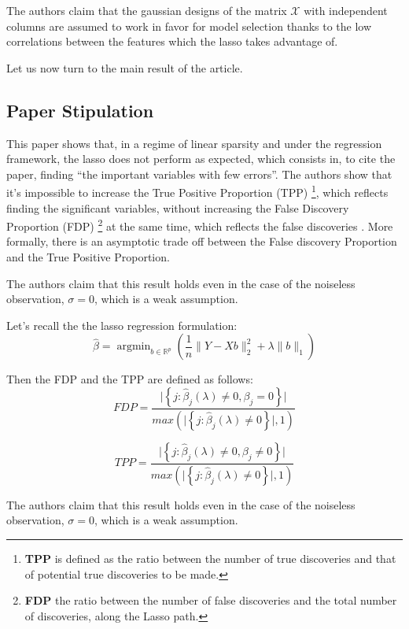 \documentclass[10pt,onecolumn,letterpaper]{article}
\DeclareMathOperator*{\argmin}{argmin}
\begin{document}
The authors claim that the gaussian designs of the matrix $\mathcal{X}$ with independent columns are assumed to work in favor for model selection thanks to the low correlations between the features which the lasso takes advantage of.


Let us now turn to the main result of the article.


\subsection{Paper Stipulation }

This paper shows that, in a regime of linear sparsity and under the regression framework, the lasso does not perform as expected, which consists in, to cite the paper, finding “the important variables with few errors”. The authors show that it’s impossible to increase the True Positive Proportion (TPP)  \footnote{\label{tpp}\textbf{TPP} is defined as the ratio between the number of true discoveries and that of potential true discoveries to be made.},  which reflects finding the significant variables, without increasing the False Discovery Proportion (FDP) \footnote{\label{fdp}
\textbf{FDP} the ratio between the number of false discoveries and the total number of discoveries, along the Lasso path.} at the same time, which reflects the false discoveries . More formally, there is an asymptotic trade off between the False discovery Proportion and the True Positive Proportion.
\newline 

The authors claim that this result holds even in the case of the noiseless observation, $\sigma = 0$, which is a weak assumption.
\newline 

Let's recall the the lasso regression formulation:
$$
\hat{\beta} = \argmin_{b \in \mathbb{R}^p} \left( \frac{1}{n}\lVert Y - Xb \rVert_2^2 + \lambda \lVert b \rVert_1 \right )
$$

Then the FDP and the TPP are defined as follows:
$$
FDP = \frac{\vert \left\{ j: \hat{\beta}_j(\lambda) \neq 0, \beta_j = 0 \right\} \vert}{ max \left( \vert \left\{ j: \hat{\beta}_j(\lambda) \neq 0 \right\} \vert, 1 \right) }
$$

$$
TPP = \frac{\vert \left\{ j: \hat{\beta}_j(\lambda) \neq 0, \beta_j \neq 0 \right\} \vert}{ max \left( \vert \left\{ j: \hat{\beta}_j(\lambda) \neq 0 \right\} \vert, 1 \right) }
$$

The authors claim that this result holds even in the case of the noiseless observation, $\sigma = 0$, which is a weak assumption.
\newline
\end{document}
